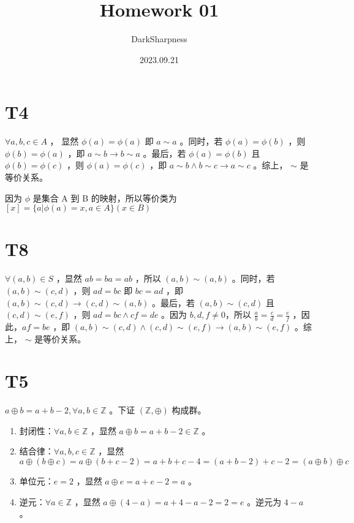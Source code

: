 \documentclass[fontset=windows]{article}
\title{\heiti\zihao{2} Homework 01}
\author{DarkSharpness}
\date{2023.09.21}
\begin{document}
	\maketitle

\tableofcontents


\section*{T4}

$\forall a,b,c \in A$ ， 显然 $\phi (a) = \phi(a)$ 即 $ a \sim a $ 。同时，若 $\phi(a) = \phi(b)$ ，则 $\phi(b) = \phi(a)$ ，即 $ a \sim b \rightarrow b \sim a $ 。最后，若 $\phi(a) = \phi(b)$ 且 $\phi(b) = \phi(c)$ ，则 $\phi(a) = \phi(c)$ ，即 $ a \sim b \wedge b \sim c \rightarrow a \sim c $ 。综上， $\sim$ 是等价关系。

因为 $\phi$ 是集合 A 到 B 的映射，所以等价类为 $ [x] = \{a | \phi(a) = x , a \in A \} (x \in B) $

\section*{T8}

$\forall (a,b) \in S$ ，显然 $ab = ba = ab$ ，所以 $(a,b) \sim (a,b)$ 。同时，若 $(a,b) \sim (c,d)$ ，则 $ad = bc$ 即 $bc = ad$ ，即 $ (a,b) \sim (c,d) \rightarrow (c,d) \sim (a,b) $ 。最后，若 $(a,b) \sim (c,d)$ 且 $(c,d) \sim (e,f)$ ，则 $ad = bc \wedge cf = de$ 。因为 $b,d,f \ne 0$，所以 $\frac a b = \frac c d = \frac e f$ ，因此，$af = be$ ，即 $ (a,b) \sim (c,d) \wedge (c,d) \sim (e,f) \rightarrow (a,b) \sim (e,f) $ 。综上， $\sim$ 是等价关系。


\section*{T5}

$ a \oplus b = a + b - 2 , \forall a,b \in \mathbb{Z}$ 。下证 $(\mathbb{Z} , \oplus)$ 构成群。

\begin{enumerate}
    \item 封闭性：$\forall a,b \in \mathbb{Z}$ ，显然 $a \oplus b = a + b - 2 \in \mathbb{Z}$ 。
    \item 结合律：$\forall a,b,c \in \mathbb{Z}$ ，显然 $a \oplus (b \oplus c) = a \oplus (b + c - 2) = a + b + c - 4 = (a + b - 2) + c - 2 = (a \oplus b) \oplus c$ 
    \item 单位元：$e = 2$ ，显然 $a \oplus e = a + e - 2 = a$ 。
    \item 逆元：$\forall a \in \mathbb{Z}$ ，显然 $a \oplus (4 - a) = a + 4 - a - 2 = 2 = e$ 。逆元为 $4 - a$ 。
\end{enumerate}
\end{document}
